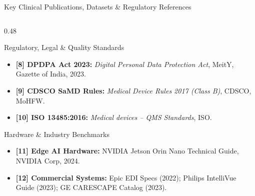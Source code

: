 \documentclass[aspectratio=169, 11pt]{beamer}
\begin{document}
\begin{frame}{Key Clinical Publications, Datasets \& Regulatory References}
\begin{columns}[t]
        \begin{column}{0.48\textwidth}
            \begin{block}{\textcolor{neonAmber}{Regulatory, Legal \& Quality Standards}}
                \tiny
                \begin{itemize}
                    \item \textbf{[8] DPDPA Act 2023:} \textit{Digital Personal Data Protection Act}, MeitY, Gazette of India, 2023.
                    \item \textbf{[9] CDSCO SaMD Rules:} \textit{Medical Device Rules 2017 (Class B)}, CDSCO, MoHFW.
                    \item \textbf{[10] ISO 13485:2016:} \textit{Medical devices -- QMS Standards}, ISO.
                \end{itemize}
            \end{block}

            \begin{block}{\textcolor{neonRose}{Hardware \& Industry Benchmarks}}
                \tiny
                \begin{itemize}
                    \item \textbf{[11] Edge AI Hardware:} NVIDIA Jetson Orin Nano Technical Guide, NVIDIA Corp, 2024.
                    \item \textbf{[12] Commercial Systems:} Epic EDI Specs (2022); Philips IntelliVue Guide (2023); GE CARESCAPE Catalog (2023).
                \end{itemize}
            \end{block}
        \end{column}
    \end{columns}
\end{frame}
\end{document}
